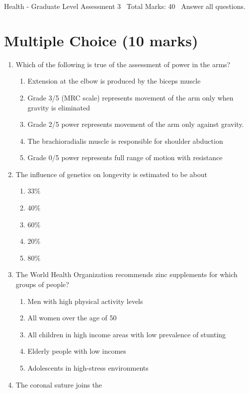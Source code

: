 \documentclass[12pt]{article}
\begin{document}
\begin{center}
Health - Graduate Level Assessment 3 \
Total Marks: 40 \
Answer all questions.
\end{center}

\section*{Multiple Choice (10 marks)}
\begin{enumerate}[label=\arabic*.]
\item Which of the following is true of the assessment of power in the arms?
\begin{enumerate}[label=(\alph*)]
    \item Extension at the elbow is produced by the biceps muscle
    \item Grade 3/5 (MRC scale) represents movement of the arm only when gravity is eliminated
    \item Grade 2/5 power represents movement of the arm only against gravity.
    \item The brachioradialis muscle is responsible for shoulder abduction
    \item Grade 0/5 power represents full range of motion with resistance
\end{enumerate}
\item The influence of genetics on longevity is estimated to be about
\begin{enumerate}[label=(\alph*)]
    \item 33\%
    \item 40\%
    \item 60\%
    \item 20\%
    \item 80\%
\end{enumerate}
\item The World Health Organization recommends zinc supplements for which groups of people?
\begin{enumerate}[label=(\alph*)]
    \item Men with high physical activity levels
    \item All women over the age of 50
    \item All children in high income areas with low prevalence of stunting
    \item Elderly people with low incomes
    \item Adolescents in high-stress environments
\end{enumerate}
\item The coronal suture joins the

\end{enumerate}
\end{document}
